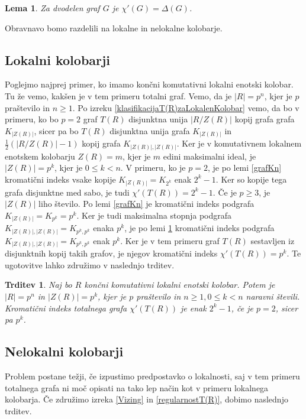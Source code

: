 \documentclass[a4paper, 12pt]{amsart}
\theoremstyle{definition} %
\theoremstyle{plain} %
\newtheorem{lema}[definicija]{Lema}
\newtheorem{trditev}[definicija]{Trditev}
\begin{document}
\begin{lema}
\label{dvodelenGraf}
Za dvodelen graf $G$ je $\chi'(G) = \Delta(G)$.
\end{lema}
Obravnavo bomo razdelili na lokalne in nelokalne kolobarje.

\subsection{Lokalni kolobarji}
Poglejmo najprej primer, ko imamo končni komutativni lokalni enotski kolobar.  Tu že vemo, kakšen je v tem primeru totalni graf. Vemo, da je $|R| = p^n$, kjer je $p$ praštevilo in $n\ge 1$. Po izreku \ref{klasifikacijaT(R)zaLokalenKolobar} vemo, da bo v primeru, ko bo $p=2$ graf $T(R)$ disjunktna unija $|R/Z(R)|$ kopij grafa grafa $K_{|Z(R)|}$, sicer pa bo $T(R)$ disjunktna unija grafa $K_{|Z(R)|}$ in $\frac{1}{2}(|R/Z(R)| - 1)$ kopij grafa $K_{|Z(R)|,|Z(R)|}$. Ker je v komutativnem lokalnem enotskem kolobarju $Z(R) = m$, kjer je $m$ edini maksimalni ideal, je $|Z(R)| = p^k$, kjer je $0 \le k < n$. V primeru, ko je $p=2$, je po lemi \ref{grafKn} kromatični indeks vsake kopije $K_{|Z(R)|} = K_{2^k}$ enak $2^k -1$. Ker so kopije tega grafa disjunktne med sabo, je tudi $\chi'(T(R)) = 2^k - 1$. Če je $p\ge 3$, je $|Z(R)|$ liho število. Po lemi \ref{grafKn} je kromatični indeks podgrafa $K_{|Z(R)|} = K_{p^k} = p^k$. Ker  je tudi maksimalna stopnja podgrafa $K_{|Z(R)|,|Z(R)|} = K_{p^k,p^k}$ enaka $p^k$, je po lemi \ref{dvodelenGraf} kromatični indeks podgrafa $K_{|Z(R)|,|Z(R)|} = K_{p^k,p^k}$ enak $p^k$. Ker je v tem primeru graf $T(R)$ sestavljen iz disjunktnih kopij takih grafov, je njegov kromatični indeks $\chi'(T(R)) = p^k$. Te ugotovitve lahko združimo v naslednjo trditev.

\begin{trditev}
\label{kromaticniIndeksT(R)zaLokalniKolobar}
Naj bo $R$ končni komutativni lokalni enotski kolobar. Potem je $|R|=p^n$ in $|Z(R)| = p^k$, kjer je $p$ praštevilo in $n\ge 1, 0 \le k < n$  naravni števili. Kromatični indeks totalnega grafa $\chi'(T(R))$ je enak $2^k -1$, če je $p=2$, sicer pa $p^k$.
\end{trditev}

\subsection{Nelokalni kolobarji}
Problem postane težji, če izpustimo predpostavko o lokalnosti, saj v tem primeru totalnega grafa ni moč opisati na tako lep način kot v primeru lokalnega kolobarja. Če združimo izreka \ref{Vizing} in \ref{regularnostT(R)}, dobimo naslednjo trditev.
\end{document}
